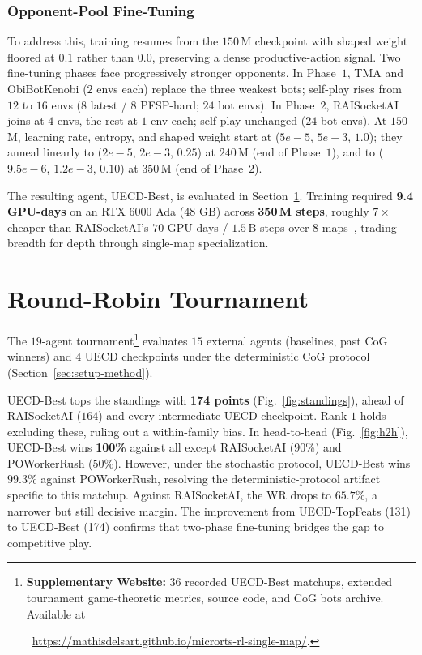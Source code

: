 \documentclass[conference]{IEEEtran}
\newif\ifanonymous
\newcommand{\code}[1]{{\ttfamily\hyphenchar\font=45\relax #1}}
\begin{document}
\subsubsection{\textbf{Opponent-Pool Fine-Tuning}}
\label{sec:finetuning}

To address this, training resumes from the $150$\,M checkpoint with shaped weight floored at $0.1$ rather than $0.0$, preserving a dense productive-action signal. Two fine-tuning phases face progressively stronger opponents. In Phase~$1$, TMA and ObiBotKenobi ($2$ envs each) replace the three weakest bots; self-play rises from $12$ to $16$ envs ($8$ latest / $8$ PFSP-hard; $24$ bot envs). In Phase~$2$, RAISocketAI joins at $4$ envs, the rest at $1$ env each; self-play unchanged ($24$ bot envs). At $150$\,M, learning rate, entropy, and shaped weight start at ($5e{-}5$, $5e{-}3$, $1.0$); they anneal linearly to ($2e{-}5$, $2e{-}3$, $0.25$) at $240$\,M (end of Phase~$1$), and to ($9.5e{-}6$, $1.2e{-}3$, $0.10$) at $350$\,M (end of Phase~$2$).

The resulting agent, \code{UECD-Best}, is evaluated in Section~\ref{sec:tournament}. Training required \textbf{9.4 GPU-days} on an RTX $6000$ Ada ($48$ GB) across \textbf{350\,M steps}, roughly $7\times$ cheaper than RAISocketAI's $70$ GPU-days / $1.5$\,B steps over $8$ maps~\cite{goodfriendCompetitionWinningDeep2024}, trading breadth for depth through single-map specialization.

\section{Round-Robin Tournament}
\label{sec:tournament}

The $19$-agent tournament\footnote{\textbf{Supplementary Website:} $36$ recorded \code{UECD-Best} matchups, extended tournament game-theoretic metrics, source code, and CoG bots archive. Available at%
  \ifanonymous
    ~[URL \textit{anonymized} for double-blind review].%
  \else
    ~\url{https://mathisdelsart.github.io/microrts-rl-single-map/}.%
  \fi
  }
evaluates $15$ external agents (baselines, past CoG winners) and $4$ UECD checkpoints under the deterministic CoG protocol (Section~\ref{sec:setup-method}).

\code{UECD-Best} tops the standings with \textbf{174 points} (Fig.~\ref{fig:standings}), ahead of RAISocketAI ($164$) and every intermediate \code{UECD} checkpoint. Rank-$1$ holds excluding these, ruling out a within-family bias. In head-to-head (Fig.~\ref{fig:h2h}), \code{UECD-Best} wins \textbf{100\%} against all except RAISocketAI ($90$\%) and POWorkerRush ($50$\%). However, under the stochastic protocol, \code{UECD-Best} wins $99.3$\% against POWorkerRush, resolving the deterministic-protocol artifact specific to this matchup. Against RAISocketAI, the WR drops to $65.7$\%, a narrower but still decisive margin. The improvement from \code{UECD-TopFeats} (131) to \code{UECD-Best} (174) confirms that two-phase fine-tuning bridges the gap to competitive play.
   
\end{document}
